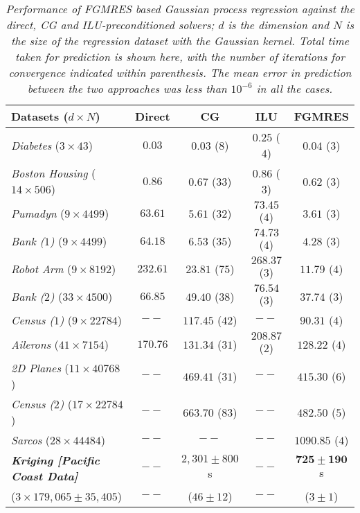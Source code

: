 \documentclass[10pt,journal,letterpaper,compsoc]{IEEEtran}
\begin{document}
\begin{table*}[bth]
\caption{\emph{Performance of FGMRES based Gaussian process regression against the direct, CG \cite{GPML_Mackay} and ILU-preconditioned solvers; $d$ is the dimension and $N$ is the size of the regression dataset with the Gaussian kernel. Total time taken for prediction is shown here, with the number of iterations for convergence indicated within parenthesis. The mean error in prediction between the two approaches was less than $10^{-6}$ in all the cases.}\label{table:fgmres_gpr}}
\centering
\begin{tabular}{||l|c|c|c|c||}
\hline\hline
Datasets ($d\times N$)	& Direct \cite{GPML_Rasmussen} & CG \cite{GPML_Mackay} 	& ILU & FGMRES\\
\hline\hline
\emph{Diabetes} ($3 \times 43$)	& $0.03$ 	& $\mathbf{0.03}$ ($8$) 	& $0.25$ ($4$) 	& $0.04$ (${3}$)\\
\emph{Boston Housing} ($14 \times 506$)	& $0.86$ 	& $0.67$ ($33$) 	& $0.86$ ($3$) 	& $\mathbf{0.62}$ (${3}$)\\
\emph{Pumadyn} ($9 \times 4499$)	& $63.61$ 	& $5.61$ ($32$) 	& $73.45$ ($4$) 	& $\mathbf{3.61}$ (${3}$)\\
\emph{Bank ($1$)} ($9 \times 4499$)	& $64.18$ 	& $6.53$ ($35$) 	& $74.73$ ($4$) 	& $\mathbf{4.28}$ (${3}$)\\
\emph{Robot Arm} ($9 \times 8192$)	& $232.61$ 	& $23.81$ ($75$) 	& $268.37$ ($3$) 	& $\mathbf{11.79}$ (${4}$)\\
\emph{Bank ($2$)} ($33 \times 4500$)	& $66.85$ 	& $49.40$ ($38$) 	& $76.54$ ($3$) 	& $\mathbf{37.74}$ (${3}$)\\
\emph{Census ($1$)} ($9 \times 22784$)	& $--$ 	& $117.45$ ($42$) 	& $--$ 	& $\mathbf{90.31}$ (${4}$)\\
\emph{Ailerons} ($41 \times 7154$)	& $170.76$ 	& $131.34$ ($31$) 	& $208.87$ ($2$) 	& $\mathbf{128.22}$ (${4}$)\\
\emph{2D Planes} ($11 \times 40768$)	& $--$ 	& $469.41$ ($31$) 	& $--$ 	& $\mathbf{415.30}$ (${6}$)\\
\emph{Census ($2$)} ($17 \times 22784$)	& $--$ 	& $663.70$ ($83$) 	& $--$ 	& $\mathbf{482.50}$ (${5}$)\\
\emph{Sarcos} ($28 \times 44484$)	& $--$ 	& $--$ 	& $--$ 	& $\mathbf{1090.85}$ (${4}$)\\
\hline\hline
\emph{\textbf{Kriging [Pacific Coast Data]}} & $--$ & $2,301\pm800$s & $--$ & $\mathbf{725\pm190}$s \\
($3 \times 179,065\pm35,405$) 	& $--$ & ($46\pm12$) & $--$ & ($3\pm1$)\\ \hline\hline
\end{tabular}
\end{table*}
\end{document}
